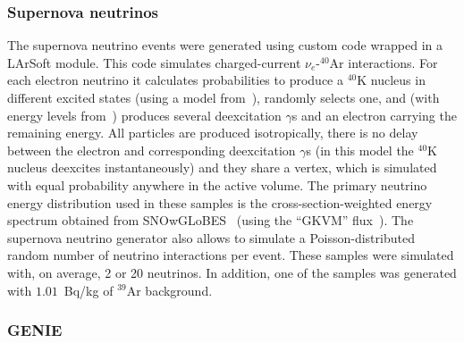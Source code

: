 

\subsubsection{Supernova neutrinos}

The supernova neutrino events were generated using custom code wrapped in a LArSoft module.
This code simulates charged-current $\nu_e$-$^{40}$Ar interactions.
For each electron neutrino it calculates probabilities to produce a $^{40}$K nucleus
in different excited states (using a model from~\cite{Bhattacharya:1998hc}),
randomly selects one, and (with energy levels from~\cite{Cameron:2004myb}) 
produces several deexcitation $\gamma$s and an electron carrying the remaining energy.
All particles are produced isotropically,
there is no delay between the electron and corresponding deexcitation $\gamma$s
(in this model the $^{40}$K nucleus deexcites instantaneously) and they share a vertex,
which is simulated with equal probability anywhere in the active volume.
The primary neutrino energy distribution used in these samples is the cross-section-weighted 
energy spectrum obtained from SNOwGLoBES~\cite{snowglobes} (using the ``GKVM'' flux~\cite{GKVM}).
The supernova neutrino generator also allows to simulate a Poisson-distributed random number 
of neutrino interactions per event. These samples were simulated with, on average, 2 or 20 neutrinos.
In addition, one of the samples was generated with $1.01$~Bq/kg of $^{39}$Ar background.

\subsubsection{GENIE}

